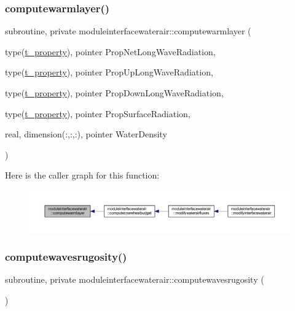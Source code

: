 \subsubsection{\texorpdfstring{computewarmlayer()}{computewarmlayer()}}
{\footnotesize\ttfamily subroutine, private moduleinterfacewaterair\+::computewarmlayer (\begin{DoxyParamCaption}\item[{type(\mbox{\hyperlink{structmoduleinterfacewaterair_1_1t__property}{t\+\_\+property}}), pointer}]{Prop\+Net\+Long\+Wave\+Radiation,  }\item[{type(\mbox{\hyperlink{structmoduleinterfacewaterair_1_1t__property}{t\+\_\+property}}), pointer}]{Prop\+Up\+Long\+Wave\+Radiation,  }\item[{type(\mbox{\hyperlink{structmoduleinterfacewaterair_1_1t__property}{t\+\_\+property}}), pointer}]{Prop\+Down\+Long\+Wave\+Radiation,  }\item[{type(\mbox{\hyperlink{structmoduleinterfacewaterair_1_1t__property}{t\+\_\+property}}), pointer}]{Prop\+Surface\+Radiation,  }\item[{real, dimension(\+:,\+:,\+:), pointer}]{Water\+Density }\end{DoxyParamCaption})\hspace{0.3cm}{\ttfamily [private]}}

Here is the caller graph for this function\+:\nopagebreak
\begin{figure}[H]
\begin{center}
\leavevmode
\includegraphics[width=350pt]{namespacemoduleinterfacewaterair_a4dbe6db87de8afe751f851ce37f72dda_icgraph}
\end{center}
\end{figure}
\mbox{\label{namespacemoduleinterfacewaterair_abb9a2be6b590714a3c5b58da190ce52f}} 
\subsubsection{\texorpdfstring{computewavesrugosity()}{computewavesrugosity()}}
{\footnotesize\ttfamily subroutine, private moduleinterfacewaterair\+::computewavesrugosity (\begin{DoxyParamCaption}{ }\end{DoxyParamCaption})\hspace{0.3cm}{\ttfamily [private]}}


